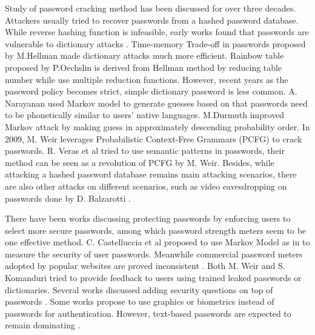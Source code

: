 Study of password cracking method has been discussed for over three decades. Attackers usually tried to recover passwords from a hashed password database. While reverse hashing function is infeasible, early works found that passwords are vulnerable to dictionary attacks \cite{morris1979password}. Time-memory Trade-off in passwords proposed by M.Hellman \cite{hellman1980cryptanalytic} made dictionary attacks much more efficient. Rainbow table proposed by P.Oechslin \cite{oechslin2003making} is derived from Hellman method \cite{hellman1980cryptanalytic} by reducing table number while use multiple reduction functions. However, recent years as the password policy becomes strict, simple dictionary password is less common. A. Narayanan \cite{narayanan2005fast} used Markov model to generate guesses based on that passwords need to be phonetically similar to users' native languages. M.Durmuth \cite{castelluccia2013privacy} improved Markov attack by making guess in approximately descending probability order. In 2009, M. Weir \cite{weir2009password} leverages Probabilistic Context-Free Grammars (PCFG) to crack passwords. R. Veras et al\cite{veras2014semantic} tried to use semantic patterns in passwords, their method can be seen as a revolution of PCFG by M. Weir. Besides, while attacking a hashed password database remains main attacking scenarios, there are also other attacks on different scenarios, such as video eavesdropping on passwords done by D. Balzarotti \cite{balzarotti2008clearshot}.

There have been works discussing protecting passwords by enforcing users to select more secure passwords, among which password strength meters seem to be one effective method. C. Castelluccia et al \cite{castelluccia2012adaptive} proposed to use Markov Model as in \cite{narayanan2005fast} to measure the security of user passwords. Meanwhile commercial password meters adopted by popular websites are proved inconsistent \cite{de2014very}. Both M. Weir \cite{weir2010testing} and S. Komanduri \cite{komanduri2014telepathwords} tried to provide feedback to users using trained leaked passwords or dictionaries. Several works discussed adding security questions on top of passwords \cite{pinkas2002securing}\cite{schechter2009s}\cite{brainard2006fourth}. Some works propose to use graphics \cite{davis2004user}\cite{jermyn1999design} or biometrics \cite{jain2006biometrics} instead of passwords for authentication. However, text-based passwords are expected to remain dominating \cite{bonneau2012quest}.